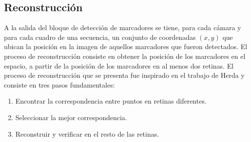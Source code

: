 \subsection{Reconstrucción}
A la salida del bloque de detección de marcadores se tiene, para cada cámara y para cada cuadro de una secuencia, un conjunto de coordenadas $(x,y)$ que ubican la posición en la imagen de aquellos marcadores que fueron detectados.
El proceso de reconstrucción consiste en obtener la posición de los marcadores en el espacio, a partir de la posición de los marcadores en al menos dos retinas.
%
%
El proceso de reconstrucción que se presenta fue inspirado en el trabajo de Herda y consiste en tres pasos fundamentales:
\vspace{-0.2cm}
\begin{enumerate}
\item Encontrar la correspondencia entre puntos en retinas diferentes.
\item Seleccionar la mejor correspondencia.
\item Reconstruir y verificar en el resto de las retinas.
\end{enumerate}
\vspace{-0.8cm}
